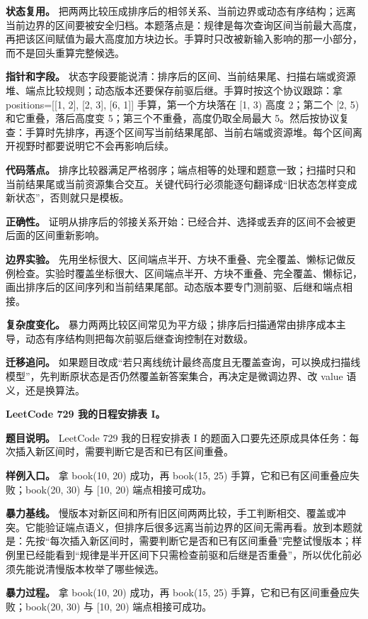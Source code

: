 \textbf{状态复用。} 把两两比较压成排序后的相邻关系、当前边界或动态有序结构；远离当前边界的区间要被安全归档。本题落点是：规律是每次查询区间当前最大高度，再把该区间赋值为最大高度加方块边长。手算时只改被新输入影响的那一小部分，而不是回头重算完整候选。

\textbf{指针和字段。} 状态字段要能说清：排序后的区间、当前结果尾、扫描右端或资源堆、端点比较规则；动态版本还要保存前驱后继。手算时按这个协议跟踪：拿 positions=[[1, 2], [2, 3], [6, 1]] 手算，第一个方块落在 [1, 3) 高度 2；第二个 [2, 5) 和它重叠，落后高度变 5；第三个不重叠，高度仍取全局最大 5。然后按协议复查：手算时先排序，再逐个区间写当前结果尾部、当前右端或资源堆。每个区间离开视野时都要说明它不会再影响后续。

\textbf{代码落点。} 排序比较器满足严格弱序；端点相等的处理和题意一致；扫描时只和当前结果尾或当前资源集合交互。关键代码行必须能逐句翻译成“旧状态怎样变成新状态”，否则就只是模板。

\textbf{正确性。} 证明从排序后的邻接关系开始：已经合并、选择或丢弃的区间不会被更后面的区间重新影响。

\textbf{边界实验。} 先用坐标很大、区间端点半开、方块不重叠、完全覆盖、懒标记做反例检查。实验时覆盖坐标很大、区间端点半开、方块不重叠、完全覆盖、懒标记，画出排序后的区间序列和当前结果尾部。动态版本要专门测前驱、后继和端点相接。

\textbf{复杂度变化。} 暴力两两比较区间常见为平方级；排序后扫描通常由排序成本主导，动态有序结构则把每次前驱后继查询控制在对数级。

\textbf{迁移追问。} 如果题目改成“若只离线统计最终高度且无覆盖查询，可以换成扫描线模型”，先判断原状态是否仍然覆盖新答案集合，再决定是微调边界、改 value 语义，还是换算法。

\noindent\textbf{LeetCode 729 我的日程安排表 I。}

\textbf{题目说明。} LeetCode 729 我的日程安排表 I 的题面入口要先还原成具体任务：每次插入新区间时，需要判断它是否和已有区间重叠。

\textbf{样例入口。} 拿 book(10, 20) 成功，再 book(15, 25) 手算，它和已有区间重叠应失败；book(20, 30) 与 [10, 20) 端点相接可成功。

\textbf{暴力基线。} 慢版本对新区间和所有旧区间两两比较，手工判断相交、覆盖或冲突。它能验证端点语义，但排序后很多远离当前边界的区间无需再看。放到本题就是：先按“每次插入新区间时，需要判断它是否和已有区间重叠”完整试慢版本；样例里已经能看到“规律是半开区间下只需检查前驱和后继是否重叠”，所以优化前必须先能说清慢版本枚举了哪些候选。

\textbf{暴力过程。} 拿 book(10, 20) 成功，再 book(15, 25) 手算，它和已有区间重叠应失败；book(20, 30) 与 [10, 20) 端点相接可成功。

